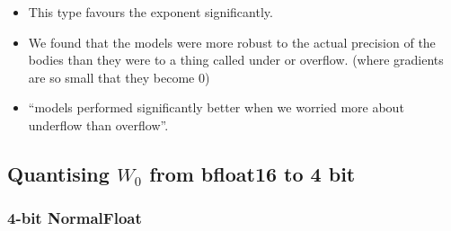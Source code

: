 \documentclass[11pt]{article}
\begin{document}
\begin{minipage}[l]{.5\linewidth}
    \begin{figure}[H]
        \centering
    \end{figure}    
\end{minipage}\hfill
\begin{minipage}[r]{.48\linewidth}
    \begin{itemize}
        \item This type favours the exponent significantly. 
        \item We found that the models were more robust to the actual precision of the bodies than they were to a thing called under or overflow. (where gradients are so small that they become 0)
        \item ``models performed significantly better when we worried more about underflow than overflow''.
    \end{itemize}
\end{minipage}

\subsection{Quantising $W_0$ from bfloat16 to 4 bit}

\subsubsection{4-bit NormalFloat}
\end{document}
